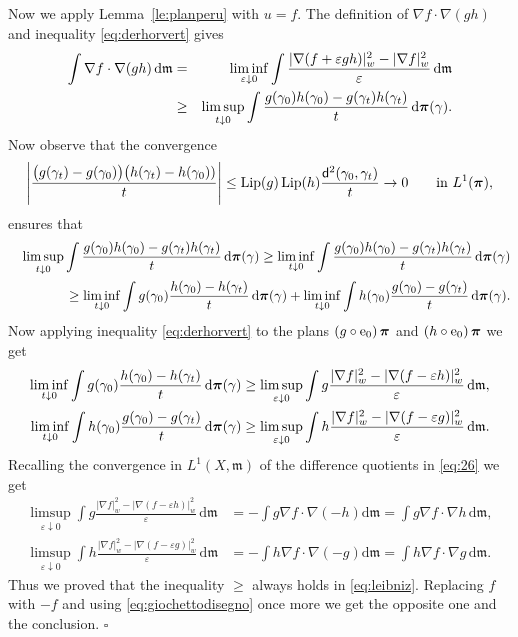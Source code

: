 \documentclass[reqno,11pt]{article}
\numberwithin{equation}{section}
\newcommand{\mm}{{\mbox{\boldmath$m$}}}
\newcommand{\ppi}{{\mbox{\boldmath$\pi$}}}
\newcommand{\sfd}{{\sf d}}
\newcommand{\rme}{{\mathrm e}}
\newcommand{\Lip}{\mathop{\rm Lip}\nolimits}          %
\renewcommand{\d}{{\mathrm d}}
\newcommand{\eps}{\varepsilon}
\newenvironment{proof}{\removelastskip\par\medskip   %
\noindent{\em Proof.}
\rm}{\penalty-20\null\hfill$\square$\par\medbreak}
\newcommand{\weakgrad}[1]{|\nabla #1|_w}                %
\renewcommand{\mm}{\mathfrak m}
\begin{document}
\begin{proof}
Now we apply Lemma~\ref{le:planperu} with $u=f$. The definition of
$\nabla f\cdot\nabla(gh)$ and inequality \eqref{eq:derhorvert} gives
\begin{eqnarray*}
\int\nabla f\cdot\nabla(gh)\,\d\mm&=&
\liminf_{\eps\downarrow0}\int\frac{\weakgrad{(f+\eps
gh)}^2-\weakgrad f^2}{\eps}\,\d\mm\\
&\geq&\limsup_{t\downarrow0}\int\frac{g(\gamma_0)h(\gamma_0)-g(\gamma_t)h(\gamma_t)}t\,\d\ppi(\gamma).
\end{eqnarray*}
Now observe that the convergence
\[
\left|\frac{\big(g(\gamma_t)-g(\gamma_0)\big)\big(h(\gamma_t)-h(\gamma_0))}t\right|
\leq {\Lip(g)\Lip(h)}\frac{\sfd^2(\gamma_0,\gamma_t)}{t}\to0\qquad\textrm{in }L^1(\ppi),
\]
ensures that
\begin{eqnarray*}
&&\limsup_{t\downarrow0}\int\frac{g(\gamma_0)h(\gamma_0)-g(\gamma_t)h(\gamma_t)}t \,\d\ppi(\gamma)
\geq\liminf_{t\downarrow0}\int\frac{g(\gamma_0)h(\gamma_0)-g(\gamma_t)h(\gamma_t)}t\,\d\ppi(\gamma)\\
&&\geq\liminf_{t\downarrow0}\int
g(\gamma_0)\frac{h(\gamma_0)-h(\gamma_t)}t
\,\d\ppi(\gamma)+\liminf_{t\downarrow0}\int
h(\gamma_0)\frac{g(\gamma_0)-g(\gamma_t)}t \,\d\ppi(\gamma).
\end{eqnarray*}
Now applying inequality \eqref{eq:derhorvert} to the plans $(g\circ
\rme_0)\,\ppi$ and $(h\circ\rme_0)\,\ppi$ we get
\[
\begin{split}
\liminf_{t\downarrow0}\int g(\gamma_0)\frac{h(\gamma_0)-h(\gamma_t)}t \,\d\ppi(\gamma)&\geq
\limsup_{\eps\downarrow0}\int g\frac{\weakgrad f^2-\weakgrad{(f-\eps h)}^2}\eps \,\d\mm,\\
\liminf_{t\downarrow0}\int h(\gamma_0)\frac{g(\gamma_0)-g(\gamma_t)}t \,\d\ppi(\gamma)&\geq
\limsup_{\eps\downarrow0}\int h\frac{\weakgrad f^2-\weakgrad{(f-\eps g)}^2}\eps \,\d\mm.
\end{split}
\]
Recalling the convergence in $L^1(X,\mm)$ of the difference
quotients in \eqref{eq:26} we get
\[
\begin{split}
\limsup_{\eps\downarrow0}\int g  \frac{\weakgrad f^2-\weakgrad{(f-\eps h)}^2}\eps \,\d\mm&=
-\int g\nabla f\cdot\nabla(-h)\d\mm=\int g\nabla f\cdot\nabla h\,\d\mm,\\
\limsup_{\eps\downarrow0}\int h \frac{\weakgrad
f^2-\weakgrad{(f-\eps g)}^2}\eps \,\d\mm&= -\int h\nabla
f\cdot\nabla(-g)\d\mm=\int h\nabla f\cdot\nabla g\,\d\mm.
\end{split}
\]
Thus we proved that the inequality $\geq$ always holds in
\eqref{eq:leibniz}. Replacing $f$ with $-f$ and using
\eqref{eq:giochettodisegno} once more we get the opposite one and
the conclusion.
\end{proof}
\end{document}
